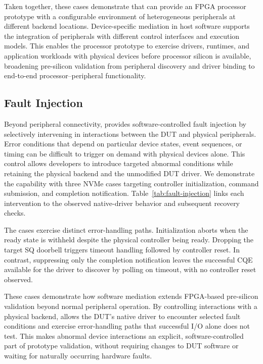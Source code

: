 Taken together, these cases demonstrate that \sys can provide an FPGA
processor prototype with a configurable environment of heterogeneous
peripherals at different backend locations. Device-specific mediation in host
software supports the integration of peripherals with different control
interfaces and execution models. This enables the processor prototype to
exercise drivers, runtimes, and application workloads with physical devices
before processor silicon is available, broadening pre-silicon validation from
peripheral discovery and driver binding to end-to-end processor--peripheral
functionality.

\subsection{Fault Injection}
\label{sec:fault-injection}

\begin{sloppypar}
Beyond peripheral connectivity, \sys provides software-controlled fault
injection by selectively intervening in interactions between the DUT and
physical peripherals. Error conditions that depend on particular device states,
event sequences, or timing can be difficult to trigger on demand with physical
devices alone. This control allows developers to introduce targeted abnormal
conditions while retaining the physical backend and the unmodified DUT driver.
We demonstrate the capability with three NVMe cases targeting controller
initialization, command submission, and completion notification.
Table~\ref{tab:fault-injection} links each intervention to the observed
native-driver behavior and subsequent recovery checks.
\end{sloppypar}



The cases exercise distinct error-handling paths. Initialization aborts when
the ready state is withheld despite the physical controller being ready.
Dropping the target SQ doorbell triggers timeout handling followed by
controller reset. In contrast, suppressing only the completion notification
leaves the successful CQE available for the driver to discover by polling on
timeout, with no controller reset observed.

These cases demonstrate how software mediation extends FPGA-based pre-silicon
validation beyond normal peripheral operation. By controlling interactions
with a physical backend, \sys allows the DUT's native driver to encounter
selected fault conditions and exercise error-handling paths that successful
I/O alone does not test. This makes abnormal device interactions an explicit,
software-controlled part of prototype validation, without requiring changes
to DUT software or waiting for naturally occurring hardware faults.
